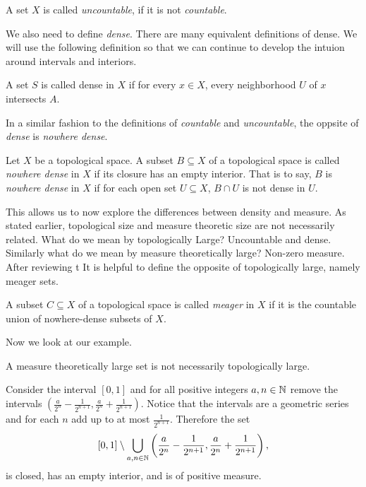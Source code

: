 {\begin{definition}[Uncountable]
    A set $X$ is called \textit{uncountable}, if it is not \textit{countable}.
\end{definition}

We also need to define \textit{dense}.  There are many equivalent definitions of dense.  We will use the following definition so that we can continue to develop the intuion around intervals and interiors. 

\begin{definition}[dense]
    A set $S$ is called dense in $X$ if for every $x \in X$, every neighborhood $U$ of $x$ intersects $A$.  
\end{definition}


In a similar fashion to the definitions of \textit{countable} and \textit{uncountable}, the oppsite of \textit{dense} is \textit{nowhere dense}.

\begin{definition}  Let $X$ be a topological space.  A subset $B \subseteq X$ of a topological space is called \textit{nowhere dense} in $X$ if its closure has an empty interior.  That is to say, $B$ is \textit{nowhere dense} in $X$ if for each open set $U\subseteq X$, $B\cap U$ is not dense in $U$.      
\end{definition}


This allows us to now explore the differences between density and measure.  As stated earlier, topological size and measure theoretic size are not necessarily related.  What do we mean by topologically Large? Uncountable and dense.  Similarly what do we mean by measure theoretically large?  Non-zero measure.  After reviewing t It is helpful to define the opposite of topologically large, namely meager sets.



\begin{definition}[Meager]  A subset $C \subseteq X$ of a topological space is called \textit{meager} in $X$ if it is the countable union of nowhere-dense subsets of $X$.    
\end{definition}
Now we look at our example.  
\begin{example}A measure theoretically large set is not necessarily topologically large.

Consider the interval $[0,1]$ and for all positive integers $a,n \in \mathbb{N}$ remove the intervals $(\frac{a}{2^n} - \frac{1}{2^{n+1}},\frac{a}{2^n} + \frac{1}{2^{n+1}})$.  Notice that the intervals are a geometric series and for each $n$ add up to at most $\frac{1}{2^{n+1}}$.  Therefore the set 
$$[0,1] \setminus \bigcup_{a,n \in \mathbb{N}} \left(\frac{a}{2^n} - \frac{1}{2^{n+1}},\frac{a}{2^n} + \frac{1}{2^{n+1}}\right),$$
is closed, has an empty interior, and is of positive measure.  
\end{example}

}
